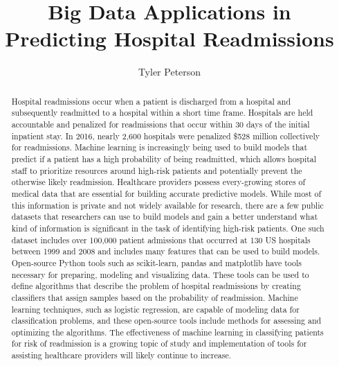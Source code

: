 \documentclass[sigconf]{acmart}
\begin{document}
\title{Big Data Applications in Predicting Hospital Readmissions}

\author{Tyler Peterson}

\renewcommand{\shortauthors}{G. v. Laszewski}

\begin{abstract}

  Hospital readmissions occur when a patient is discharged from a hospital and subsequently readmitted to a hospital within a short time frame. Hospitals are held accountable and penalized for readmissions that occur within 30 days of the initial inpatient stay. In 2016, nearly 2,600 hospitals were penalized \$528 million collectively for readmissions. Machine learning is increasingly being used to build models that predict if a patient has a high probability of being readmitted, which allows hospital staff to prioritize resources around high-risk patients and potentially prevent the otherwise likely readmission. Healthcare providers possess every-growing stores of medical data that are essential for building accurate predictive models. While most of this information is private and not widely available for research, there are a few public datasets that researchers can use to build models and gain a better understand what kind of information is significant in the task of identifying high-risk patients. One such dataset includes over 100,000 patient admissions that occurred at 130 US hospitals between 1999 and 2008 and includes many features that can be used to build models. Open-source Python tools such as scikit-learn, pandas and matplotlib have tools necessary for preparing, modeling and visualizing data. These tools can be used to define algorithms that describe the problem of hospital readmissions by creating classifiers that assign samples based on the probability of readmission. Machine learning techniques, such as logistic regression, are capable of modeling data for classification problems, and these open-source tools include methods for assessing and optimizing the algorithms. The effectiveness of machine learning in classifying patients for risk of readmission is a growing topic of study and implementation of tools for assisting healthcare providers will likely continue to increase.
 
\end{abstract}
\end{document}
